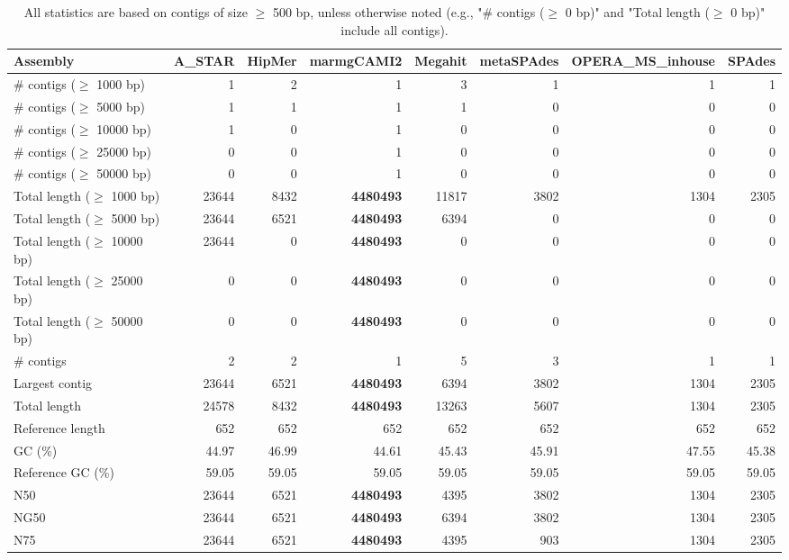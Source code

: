 \documentclass[12pt,a4paper]{article}
\begin{document}
\begin{table}[ht]
\begin{center}
\caption{All statistics are based on contigs of size $\geq$ 500 bp, unless otherwise noted (e.g., "\# contigs ($\geq$ 0 bp)" and "Total length ($\geq$ 0 bp)" include all contigs).}
\begin{tabular}{|l*{7}{|r}|}
\hline
Assembly & A\_STAR & HipMer & marmgCAMI2 & Megahit & metaSPAdes & OPERA\_MS\_inhouse & SPAdes \\ \hline
\# contigs ($\geq$ 1000 bp) & 1 & 2 & 1 & 3 & 1 & 1 & 1 \\ \hline
\# contigs ($\geq$ 5000 bp) & 1 & 1 & 1 & 1 & 0 & 0 & 0 \\ \hline
\# contigs ($\geq$ 10000 bp) & 1 & 0 & 1 & 0 & 0 & 0 & 0 \\ \hline
\# contigs ($\geq$ 25000 bp) & 0 & 0 & 1 & 0 & 0 & 0 & 0 \\ \hline
\# contigs ($\geq$ 50000 bp) & 0 & 0 & 1 & 0 & 0 & 0 & 0 \\ \hline
Total length ($\geq$ 1000 bp) & 23644 & 8432 & {\bf 4480493} & 11817 & 3802 & 1304 & 2305 \\ \hline
Total length ($\geq$ 5000 bp) & 23644 & 6521 & {\bf 4480493} & 6394 & 0 & 0 & 0 \\ \hline
Total length ($\geq$ 10000 bp) & 23644 & 0 & {\bf 4480493} & 0 & 0 & 0 & 0 \\ \hline
Total length ($\geq$ 25000 bp) & 0 & 0 & {\bf 4480493} & 0 & 0 & 0 & 0 \\ \hline
Total length ($\geq$ 50000 bp) & 0 & 0 & {\bf 4480493} & 0 & 0 & 0 & 0 \\ \hline
\# contigs & 2 & 2 & 1 & 5 & 3 & 1 & 1 \\ \hline
Largest contig & 23644 & 6521 & {\bf 4480493} & 6394 & 3802 & 1304 & 2305 \\ \hline
Total length & 24578 & 8432 & {\bf 4480493} & 13263 & 5607 & 1304 & 2305 \\ \hline
Reference length & 652 & 652 & 652 & 652 & 652 & 652 & 652 \\ \hline
GC (\%) & 44.97 & 46.99 & 44.61 & 45.43 & 45.91 & 47.55 & 45.38 \\ \hline
Reference GC (\%) & 59.05 & 59.05 & 59.05 & 59.05 & 59.05 & 59.05 & 59.05 \\ \hline
N50 & 23644 & 6521 & {\bf 4480493} & 4395 & 3802 & 1304 & 2305 \\ \hline
NG50 & 23644 & 6521 & {\bf 4480493} & 6394 & 3802 & 1304 & 2305 \\ \hline
N75 & 23644 & 6521 & {\bf 4480493} & 4395 & 903 & 1304 & 2305 \\ \hline

\end{tabular}
\end{center}
\end{table}
\end{document}
